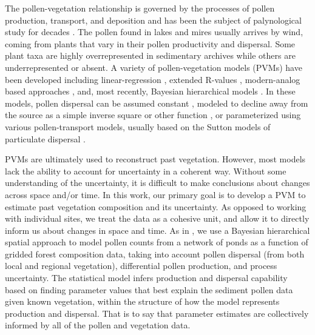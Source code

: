 \documentclass[12pt]{article}
\begin{document}
The pollen-vegetation relationship is governed by the processes of
pollen production, transport, and deposition and has been the subject
of palynological study for decades \citep{tauber1965,
  jacobson1981selection, jackson1994pollen, jackson1999pollen,
  sugita2007theory1, sugita2007theory2, prentice1988records}. The
pollen found in lakes and mires usually arrives by wind, coming from
plants that vary in their pollen productivity and dispersal. Some
plant taxa are highly overrepresented in sedimentary archives while
others are underrepresented or absent. A variety of pollen-vegetation
models (PVMs) have been developed including linear-regression
\citep{webb1981estimating, bradshaw1985relationships}, extended
R-values \citep{parsons1981statistical, sugita1994pollen,
  sugita2007theory1, sugita2007theory2}, modern-analog based
approaches \citep{overpeck1985quantitative, williams2003variations},
and, most recently, Bayesian hierarchical models
\citep{paciorek2009mapping, garreta2010method}.  In these models,
pollen dispersal can be assumed constant \citep{davis1963theory,
  parsons1981statistical}, modeled to decline away from the source as
a simple inverse square or other function \citep{webb1981estimating,
  calcote1995pollen, jackson1998quantitative}, or parameterized using
various pollen-transport models, usually based on the Sutton models of
particulate dispersal \citep{prentice1988records, jackson1999pollen,
  sugita2007theory1, sugita2007theory2}. 

PVMs are ultimately used to reconstruct past vegetation. However, most
models lack the ability to account for uncertainty in a coherent
way. Without some understanding of the uncertainty, it is difficult to
make conclusions about changes across space and/or time. In this work,
our primary goal is to develop a PVM to estimate past vegetation
composition and its uncertainty. As opposed to working with individual
sites, we treat the data as a cohesive unit, and allow it to directly
inform us about changes in space and time. As in
\citet{paciorek2009mapping}, we use a Bayesian hierarchical spatial
approach to model pollen counts from a network of ponds as a function
of gridded forest composition data, taking into account pollen
dispersal (from both local and regional vegetation), differential
pollen production, and process uncertainty.  The statistical model
infers production and dispersal capability based on finding parameter
values that best explain the sediment pollen data given known
vegetation, within the structure of how the model represents
production and dispersal. That is to say that parameter estimates are
collectively informed by all of the pollen and vegetation data.
\end{document}
